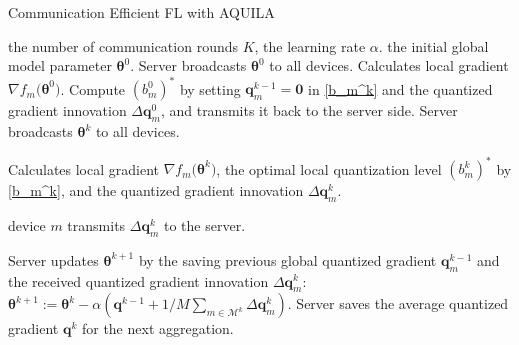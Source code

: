 \documentclass[lettersize,journal]{IEEEtran}
\begin{document}
\begin{center} 
	\begin{minipage}{1\linewidth}
		\renewcommand{\algorithmicrequire}{\textbf{Input:}}
		\renewcommand{\algorithmicensure}{\textbf{Initialize:}}
		\begin{algorithm}[H]		
            \label{AQUILA_algoirthmm}
		\caption{Communication Efficient FL with AQUILA}
			\begin{algorithmic}[1]
				\Require the number of communication rounds $K$, the learning rate $\alpha$.
				\Ensure the initial global model parameter $\boldsymbol{\theta} ^{0}$.
				\State Server broadcasts $\boldsymbol{\theta} ^{0}$ to all devices. %
				 \State Calculates local gradient ${\nabla f_m(\boldsymbol{\theta}}^{0})$.
				 \State Compute $(b_m^0)^{*}$ by setting $\boldsymbol{q}_m^{k-1} = \boldsymbol{0}$ in \eqref{b_m^k} and the quantized gradient innovation $\Delta \boldsymbol{q}_{m}^{0}$, and transmits it back to the server side.
                \EndFor
				\State Server broadcasts $\boldsymbol{\theta} ^{k}$ to all devices. 

                \State Calculates local gradient ${\nabla f_m(\boldsymbol{\theta}}^{k})$, the optimal local quantization level $(b_{m}^{k})^*$ by \eqref{b_m^k}, and the quantized gradient innovation $\Delta \boldsymbol{q}_{m}^{k}$. 
				
				\State device $m$ transmits $\Delta \boldsymbol{q}_{m}^{k}$ to the server.
				\EndIf
				
				\EndFor
				\State Server updates $\boldsymbol{\theta} ^{k+1}$ by the saving previous global quantized gradient $\boldsymbol{q}_m^{k - 1}$ and the received quantized gradient innovation $\Delta \boldsymbol{q}_m^k$: $\boldsymbol{\theta} ^{k+1}:= \boldsymbol{\theta} ^{k}-\alpha \left( \boldsymbol{q}^{k - 1} + 1 / M\sum_{m \in \mathcal{M}^k} \Delta \boldsymbol{q}_m^k \right)$.
				\State Server saves the average quantized gradient $\boldsymbol{q}^k$ for the next aggregation.
				\EndFor
			\end{algorithmic}
		\end{algorithm}
	\end{minipage}
\end{center}
\end{document}
